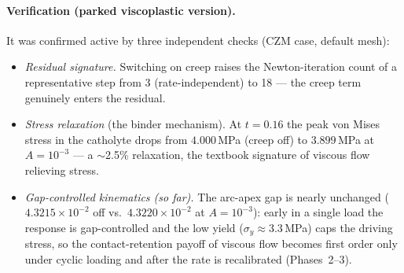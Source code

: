 \documentclass[11pt]{article}
\begin{document}
\paragraph{Verification (parked viscoplastic version).} It was confirmed active
by three independent checks (CZM case, default mesh):
\begin{itemize}
  \item \emph{Residual signature.} Switching on creep raises the Newton-iteration
  count of a representative step from 3 (rate-independent) to 18 --- the creep
  term genuinely enters the residual.
  \item \emph{Stress relaxation} (the binder mechanism). At $t=0.16$ the peak von
  Mises stress in the catholyte drops from $4.000$\,MPa (creep off) to
  $3.899$\,MPa at $A=10^{-3}$ --- a $\sim$2.5\% relaxation, the textbook signature
  of viscous flow relieving stress.
  \item \emph{Gap-controlled kinematics (so far).} The arc-apex gap is nearly
  unchanged ($4.3215\times10^{-2}$ off vs.\ $4.3220\times10^{-2}$ at $A=10^{-3}$):
  early in a single load the response is gap-controlled and the low yield
  ($\sigma_y\!\approx\!3.3$\,MPa) caps the driving stress, so the
  contact-retention payoff of viscous flow becomes first order only under cyclic
  loading and after the rate is recalibrated (Phases~2--3).
\end{itemize}
\end{document}
